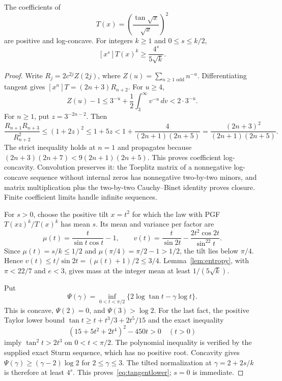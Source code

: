 \documentclass[11pt,a4paper]{article}
\theoremstyle{remark}\newtheorem*{ednote}{Editorial note (ProveIt, 2026-10-01)}
\begin{document}
\begin{lemma}\label{lem:tangent}
The coefficients of
\[
 T(x)=\left(\frac{\tan\sqrt{x}}{\sqrt{x}}\right)^2
\]
are positive and log-concave. For integers $k\ge1$ and $0\le s\le k/2$,
\begin{equation}\label{eq:tangentlower}
 [x^s]T(x)^k\ge\frac{4^s}{5\sqrt{k}}.
\end{equation}
\end{lemma}
\begin{proof}
Write $R_j=2c^{2j}Z(2j)$, where $Z(u)=\sum_{n\ge1\text{ odd}}n^{-u}$. Differentiating tangent gives $[x^n]T=(2n+3)R_{n+2}$. For $u\ge4$,
\[
 Z(u)-1\le3^{-u}+\frac12\int_3^\infty v^{-u}\,dv<2\cdot3^{-u}.
\]
For $n\ge1$, put $z=3^{-2n-2}$. Then
\[
 \frac{R_{n+1}R_{n+3}}{R_{n+2}^2}
 \le(1+2z)^2\le1+5z
 <1+\frac4{(2n+1)(2n+5)}
 =\frac{(2n+3)^2}{(2n+1)(2n+5)}.
\]
The strict inequality holds at $n=1$ and propagates because
$(2n+3)(2n+7)<9(2n+1)(2n+5)$. This proves coefficient log-concavity. Convolution preserves it: the Toeplitz matrix of a nonnegative log-concave sequence without internal zeros has nonnegative two-by-two minors, and matrix multiplication plus the two-by-two Cauchy--Binet identity proves closure. Finite coefficient limits handle infinite sequences.

For $s>0$, choose the positive tilt $x=t^2$ for which the law with PGF $T(xz)^k/T(x)^k$ has mean $s$. Its mean and variance per factor are
\[
 \mu(t)=\frac{t}{\sin t\cos t}-1,\qquad
 v(t)=\frac{t}{\sin2t}-\frac{2t^2\cos2t}{\sin^22t}.
\]
Since $\mu(t)=s/k\le1/2$ and $\mu(\pi/4)=\pi/2-1>1/2$, the tilt lies below $\pi/4$. Hence $v(t)\le t/\sin2t=(\mu(t)+1)/2\le3/4$. Lemma~\ref{lem:entropy}, with $\pi<22/7$ and $e<3$, gives mass at the integer mean at least $1/(5\sqrt{k})$.

Put
\[
 \Psi(\gamma)=\inf_{0<t<\pi/2}\{2\log\tan t-\gamma\log t\}.
\]
This is concave, $\Psi(2)=0$, and $\Psi(3)>\log2$. For the last fact, the positive Taylor lower bound $\tan t\ge t+t^3/3+2t^5/15$ and the exact inequality
\[
 (15+5t^2+2t^4)^2-450t>0\quad(t>0)
\]
imply $\tan^2t>2t^3$ on $0<t<\pi/2$. The polynomial inequality is verified by the supplied exact Sturm sequence, which has no positive root. Concavity gives $\Psi(\gamma)\ge(\gamma-2)\log2$ for $2\le\gamma\le3$. The tilted normalization at $\gamma=2+2s/k$ is therefore at least $4^s$. This proves~\eqref{eq:tangentlower}; $s=0$ is immediate.
\end{proof}
\end{document}

